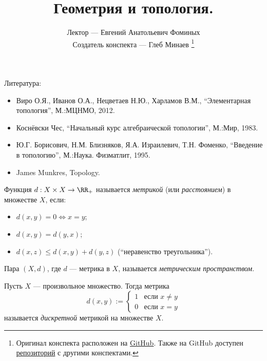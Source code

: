 \documentclass[12pt,a4paper]{article}
\title{Геометрия и топология.}
\author{Лектор --- Евгений Анатольевич Фоминых \\
        Создатель конспекта --- Глеб Минаев
        \footnote{Оригинал конспекта расположен на \href{https://github.com/lounres/SPbU-MCS-2020-M-lecture-notes/blob/master/\%D0\%93\%D0\%B8\%D0\%A2/GaT.pdf}{GitHub}. Также на GitHub доступен \href{https://github.com/lounres/SPbU-MCS-2020-M-lecture-notes}{репозиторий} с другими конспектами.}}
\date{}
\begin{document}
    \maketitle

    \listoftodos[TODOs]

    \tableofcontents

    \vspace{2em}

    Литература:
    \begin{itemize}
        \item Виро О.Я., Иванов О.А., Нецветаев Н.Ю., Харламов В.М., ``Элементарная топология'', М.:МЦНМО, 2012.
        \item Коснёвски Чес, ``Начальный курс алгебраической топологии'', М.:Мир, 1983.
        \item Ю.Г. Борисович, Н.М. Близняков, Я.А. Израилевич, Т.Н. Фоменко, ``Введение в топологию'', М.:Наука. Физматлит, 1995.
        \item James Munkres, Topology.
    \end{itemize}

    \begin{definition}
        Функция $d: X \times X \to \RR_+$ называется \emph{метрикой} (или \emph{расстоянием}) в множестве $X$, если:
        \begin{itemize}
            \item $d(x, y) = 0 \Leftrightarrow x = y$;
            \item $d(x, y) = d(y, x)$;
            \item $d(x, z) \leqslant d(x, y) + d(y, z)$ (``неравенство треугольника'').
        \end{itemize}
        Пара $(X, d)$, где $d$ --- метрика в $X$, называется \emph{метрическим пространством}.
    \end{definition}

    \begin{example}
        Пусть $X$ --- произвольное множество. Тогда метрика
        \[
            d(x, y) := 
                \begin{cases}
                    1& \text{если $x \neq y$}\\
                    0& \text{если $x = y$}
                \end{cases}
        \]
        называется \emph{дискретной} метрикой на множестве $X$.
    \end{example}
\end{document}
